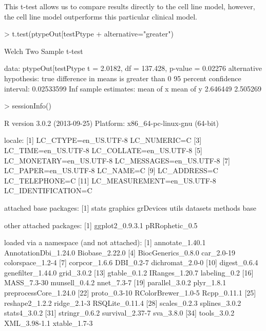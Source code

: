 \documentclass[a4paper]{article}
\begin{document}
This t-test allows us to compare results directly to the cell line model, however, the cell line model outperforms this particular clinical model.
\begin{Schunk}
\begin{Sinput}
> t.test(ptypeOut[testPtype %
+ alternative="greater")
\end{Sinput}
\begin{Soutput}
	Welch Two Sample t-test

data:  ptypeOut[testPtype %
t = 2.0182, df = 137.428, p-value = 0.02276
alternative hypothesis: true difference in means is greater than 0
95 percent confidence interval:
 0.02533599        Inf
sample estimates:
mean of x mean of y 
 2.646449  2.505269 
\end{Soutput}
\end{Schunk}

\begin{Schunk}
\begin{Sinput}
> sessionInfo()
\end{Sinput}
\begin{Soutput}
R version 3.0.2 (2013-09-25)
Platform: x86_64-pc-linux-gnu (64-bit)

locale:
 [1] LC_CTYPE=en_US.UTF-8       LC_NUMERIC=C              
 [3] LC_TIME=en_US.UTF-8        LC_COLLATE=en_US.UTF-8    
 [5] LC_MONETARY=en_US.UTF-8    LC_MESSAGES=en_US.UTF-8   
 [7] LC_PAPER=en_US.UTF-8       LC_NAME=C                 
 [9] LC_ADDRESS=C               LC_TELEPHONE=C            
[11] LC_MEASUREMENT=en_US.UTF-8 LC_IDENTIFICATION=C       

attached base packages:
[1] stats     graphics  grDevices utils     datasets  methods   base     

other attached packages:
[1] ggplot2_0.9.3.1 pRRophetic_0.5 

loaded via a namespace (and not attached):
 [1] annotate_1.40.1       AnnotationDbi_1.24.0  Biobase_2.22.0       
 [4] BiocGenerics_0.8.0    car_2.0-19            colorspace_1.2-4     
 [7] corpcor_1.6.6         DBI_0.2-7             dichromat_2.0-0      
[10] digest_0.6.4          genefilter_1.44.0     grid_3.0.2           
[13] gtable_0.1.2          IRanges_1.20.7        labeling_0.2         
[16] MASS_7.3-30           munsell_0.4.2         nnet_7.3-7           
[19] parallel_3.0.2        plyr_1.8.1            preprocessCore_1.24.0
[22] proto_0.3-10          RColorBrewer_1.0-5    Rcpp_0.11.1          
[25] reshape2_1.2.2        ridge_2.1-3           RSQLite_0.11.4       
[28] scales_0.2.3          splines_3.0.2         stats4_3.0.2         
[31] stringr_0.6.2         survival_2.37-7       sva_3.8.0            
[34] tools_3.0.2           XML_3.98-1.1          xtable_1.7-3         
\end{Soutput}
\end{Schunk}
\end{document}

